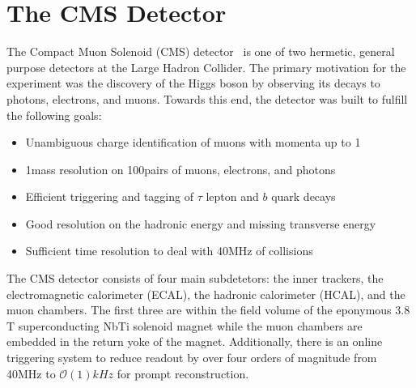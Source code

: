 \chapter{The CMS Detector}
\label{sec:cms}

The Compact Muon Solenoid (CMS) detector~\cite{CMS2008} is one of two hermetic, general purpose detectors at the Large Hadron Collider.
The primary motivation for the experiment was the discovery of the Higgs boson by observing its decays to photons, electrons, and muons.
Towards this end, the detector was built to fulfill the following goals:
\begin{itemize}
\item Unambiguous charge identification of muons with momenta up to 1\TeV
\item 1\GeV mass resolution on 100\GeV pairs of muons, electrons, and photons
\item Efficient triggering and tagging of $\tau$ lepton and $b$ quark decays
\item Good resolution on the hadronic energy and missing transverse energy
\item Sufficient time resolution to deal with 40\unit{MHz} of collisions
\end{itemize}
The CMS detector consists of four main subdetetors: the inner trackers, the electromagnetic calorimeter (ECAL), the hadronic calorimeter (HCAL), and the muon chambers.
The first three are within the field volume of the eponymous 3.8 T superconducting NbTi solenoid magnet while the muon chambers are embedded in the return yoke of the magnet.
Additionally, there is an online triggering system to reduce readout by over four orders of magnitude from 40\unit{MHz} to $\mathcal{O}(1)\unit{kHz}$ for prompt reconstruction. 

